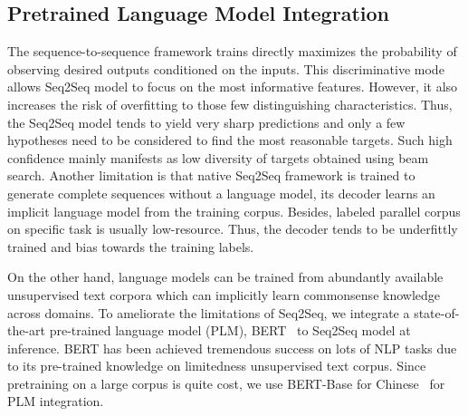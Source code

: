 \subsection{Pretrained Language Model Integration}
\label{sec:shallow_fusion}
The sequence-to-sequence framework trains directly maximizes the probability
of observing desired outputs conditioned on the inputs.
This discriminative mode allows Seq2Seq model to focus on the most informative 
features.
However, it also increases the risk of overfitting to those few distinguishing
characteristics.
Thus, the Seq2Seq model tends to yield very sharp predictions 
and only a few hypotheses need to be considered to find the most 
reasonable targets.
Such high confidence mainly manifests as low diversity of targets obtained 
using beam search.
Another limitation is that native Seq2Seq framework is trained to generate 
complete sequences without a language model, 
its decoder learns an implicit language model from the training corpus.
Besides, labeled parallel corpus on specific task is usually low-resource.
Thus, the decoder tends to be underfittly trained and bias towards the training labels.

On the other hand, language models can be trained from abundantly available
unsupervised text corpora which can implicitly learn commonsense knowledge
across domains. 
To ameliorate the limitations of Seq2Seq, 
we integrate a state-of-the-art pre-trained language model (PLM), 
BERT~\cite{devlin2018bert} to Seq2Seq model at inference.
BERT has been achieved tremendous success on lots of NLP tasks
due to its pre-trained knowledge on limitedness unsupervised text corpus.
Since pretraining on a large corpus is quite cost, 
we use BERT-Base for Chinese~\cite{wolf2019transformers}
for PLM integration. 

